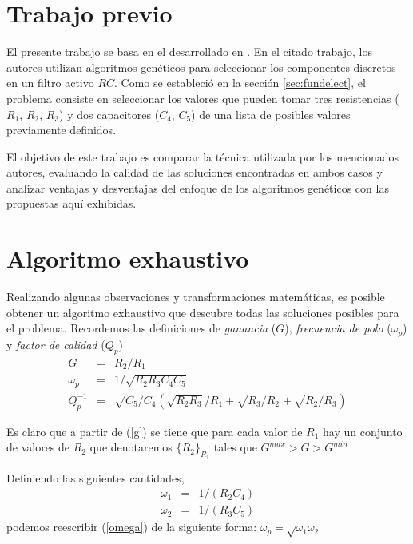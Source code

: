 \documentclass{llncs}
\begin{document}
    
  \section{\textbf{Trabajo previo}}
    \label{sec:previouswork}
    El presente trabajo se basa en el desarrollado en \cite{lov:rom:per}. En el citado trabajo, los autores
    utilizan algoritmos gen\'eticos para seleccionar los componentes discretos en un filtro activo $RC$. Como se
    estableci\'o en la secci\'on \ref{sec:fundelect}, el problema consiste en seleccionar los valores que pueden
    tomar tres resistencias ($R_1$, $R_2$, $R_3$) y dos capacitores ($C_4$,
    $C_5$) de una lista de posibles valores
    previamente definidos.
    
    El objetivo de este trabajo es comparar la t\'ecnica utilizada por los mencionados autores, evaluando la calidad
    de las soluciones encontradas en ambos casos y analizar ventajas y desventajas del enfoque de los algoritmos gen\'eticos
    con las propuestas aqu\'i exhibidas.
  
  \section{\textbf{Algoritmo exhaustivo}}
    Realizando algunas observaciones y transformaciones matem\'aticas, es posible obtener un algoritmo exhaustivo que descubre
    todas las soluciones posibles para el problema. Recordemos las definiciones
    de \textit{ganancia} ($G$), \textit{frecuencia de polo} ($\omega_p$) y
    \textit{factor de calidad} ($Q_p$)
    \begin{eqnarray}
      G &=& R_2/R_1 \label{g}\\
      \omega_p &=& 1/\sqrt{R_2 R_3 C_4 C_5} \label{omega}\\
      Q^{-1}_p &=& \sqrt{C_5/C_4}  \left(\sqrt{R_2 R_3}/R_1 + \sqrt{R_3/R_2} +
      \sqrt{R_2/R_3}\right) \label{q}
    \end{eqnarray}

    Es claro que a partir de (\ref{g}) se tiene que para cada valor de $R_1$ hay
    un conjunto de valores de $R_2$ que denotaremos 
    $\{R_2\}_{R_1}$ tales que $G^{max} > G > G^{min}$

    Definiendo las siguientes cantidades,
    \begin{eqnarray}
      \omega_1 &=& 1/(R_2 C_4) \nonumber \\
      \omega_2 &=& 1/(R_3 C_5)
      \label{omegas}
    \end{eqnarray}
    podemos reescribir (\ref{omega}) de la siguiente forma: $\omega_p = \sqrt{\omega_1  \omega_2}$
\end{document}
